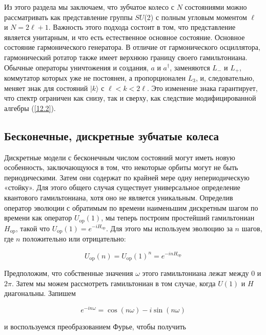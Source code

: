 \documentclass[main.tex]{subfiles}
\begin{document}
Из этого раздела мы заключаем, что зубчатое колесо с $N$ состояниями можно рассматривать как представление группы $SU$(2) с полным угловым моментом $\ell$ и $N = 2\ell + 1$. Важность этого подхода состоит в том, что представление является унитарным, и что есть естественное основное состояние. Основное состояние гармонического генератора. В отличие от гармонического осциллятора, гармонический ротатор также имеет верхнюю границу своего гамильтониана. Обычные операторы уничтожения и создания, $a$ и $a^\dagger$, заменяются $L_-$ и $L_+$, коммутатор которых уже не постоянен, а пропорционален $L_3$, и, следовательно, меняет знак для состояний $\mid k \rangle$ с $\ell <k <2\ell$. Это изменение знака гарантирует, что спектр ограничен как снизу, так и сверху, как следствие модифицированной алгебры (\ref{12.2}).

\subsection{Бесконечные, дискретные зубчатые колеса}\label{ch12.2}

Дискретные модели с бесконечным числом состояний могут иметь новую особенность, заключающуюся в том, что некоторые орбиты могут не быть периодическими. Затем они содержат по крайней мере одну непериодическую «стойку». Для этого общего случая существует универсальное определение квантового гамильтониана, хотя оно не является уникальным. Определив оператор эволюции с обратимым по времени наименьшим дискретным шагом по времени как оператор $U_{\mathrm{op}}(1)$, мы теперь построим простейший гамильтониан $H_{\mathrm{op}}$, такой что $U_{\mathrm{op}}(1) = e^{-iH_{\mathrm{op}}}$. Для этого мы используем эволюцию за $n$ шагов, где $n$ положительно или отрицательно:

\begin{equation}\label{12.6}
	U_{\mathrm{op}}(n)=U_{\mathrm{op}}(1)^{n}=e^{-i n H_{\mathrm{op}}}
\end{equation}
         
Предположим, что собственные значения $\omega$ этого гамильтониана лежат между 0 и $2\pi$. Затем мы можем рассмотреть гамильтониан в том случае, когда $U(1)$ и $H$ диагональны. Запишем

\begin{equation}\label{12.7}
	e^{-i n \omega}=\cos (n \omega)-i \sin (n \omega)
\end{equation}
          
и воспользуемся преобразованием Фурье, чтобы получить
\end{document}

